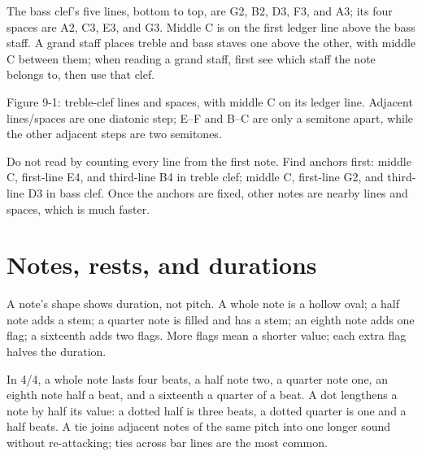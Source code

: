 The bass clef's five lines, bottom to top, are G2, B2, D3, F3, and A3; its four spaces are A2, C3, E3, and G3. Middle C is on the first ledger line above the bass staff. A grand staff places treble and bass staves one above the other, with middle C between them; when reading a grand staff, first see which staff the note belongs to, then use that clef.

\begin{center}
\begin{minipage}{0.96\linewidth}
\centering
{}

Figure 9-1: treble-clef lines and spaces, with middle C on its ledger line. Adjacent lines/spaces are one diatonic step; E--F and B--C are only a semitone apart, while the other adjacent steps are two semitones.
\end{minipage}
\end{center}

Do not read by counting every line from the first note. Find anchors first: middle C, first-line E4, and third-line B4 in treble clef; middle C, first-line G2, and third-line D3 in bass clef. Once the anchors are fixed, other notes are nearby lines and spaces, which is much faster.

\section{Notes, rests, and durations}

A note's shape shows duration, not pitch. A whole note is a hollow oval; a half note adds a stem; a quarter note is filled and has a stem; an eighth note adds one flag; a sixteenth adds two flags. More flags mean a shorter value; each extra flag halves the duration.

In 4/4, a whole note lasts four beats, a half note two, a quarter note one, an eighth note half a beat, and a sixteenth a quarter of a beat. A dot lengthens a note by half its value: a dotted half is three beats, a dotted quarter is one and a half beats. A tie joins adjacent notes of the same pitch into one longer sound without re-attacking; ties across bar lines are the most common.

